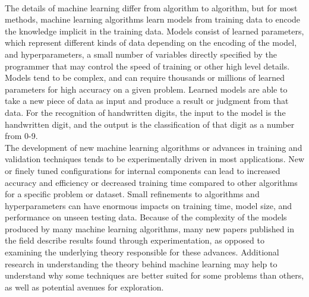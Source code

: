 \\The details of machine learning differ from algorithm to algorithm, but for most methods, machine learning algorithms learn models from training data to encode the knowledge implicit in the training data. Models consist of learned parameters, which represent different kinds of data depending on the encoding of the model, and hyperparameters, a small number of variables directly specified by the programmer that may control the speed of training or other high level details. Models tend to be complex, and can require thousands or millions of learned parameters for high accuracy on a given problem. Learned models are able to take a new piece of data as input and produce a result or judgment from that data. For the recognition of handwritten digits, the input to the model is the handwritten digit, and the output is the classification of that digit as a number from 0-9.
\\The development of new machine learning algorithms or advances in training and validation techniques tends to be experimentally driven in most applications. New or finely tuned configurations for internal components can lead to increased accuracy and efficiency or decreased training time compared to other algorithms for a specific problem or dataset. Small refinements to algorithms and hyperparameters can have enormous impacts on training time, model size, and performance on unseen testing data. Because of the complexity of the models produced by many machine learning algorithms, many new papers published in the field describe results found through experimentation, as opposed to examining the underlying theory responsible for these advances. Additional research in understanding the theory behind machine learning may help to understand why some techniques are better suited for some problems than others, as well as potential avenues for exploration.
